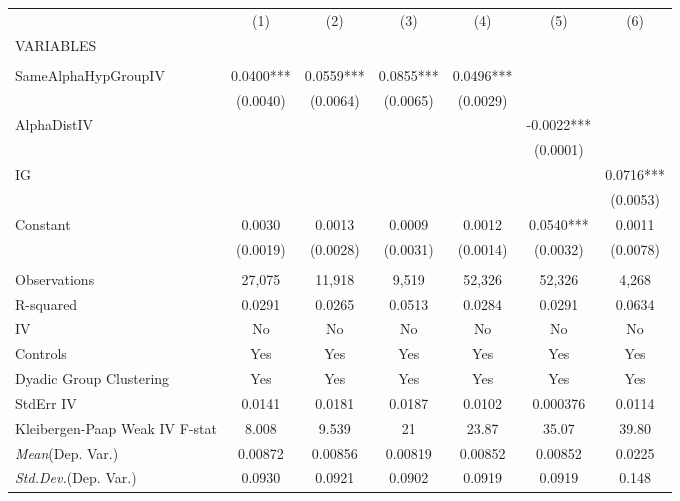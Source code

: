 \documentclass[]{article}
\begin{document}
\begin{tabular}{lcccccc} \hline
 & (1) & (2) & (3) & (4) & (5) & (6) \\
VARIABLES &  &  &  &  &  &  \\ \hline
 &  &  &  &  &  &  \\
SameAlphaHypGroupIV & 0.0400*** & 0.0559*** & 0.0855*** & 0.0496*** &  &  \\
 & (0.0040) & (0.0064) & (0.0065) & (0.0029) &  &  \\
AlphaDistIV &  &  &  &  & -0.0022*** &  \\
 &  &  &  &  & (0.0001) &  \\
IG &  &  &  &  &  & 0.0716*** \\
 &  &  &  &  &  & (0.0053) \\
Constant & 0.0030 & 0.0013 & 0.0009 & 0.0012 & 0.0540*** & 0.0011 \\
 & (0.0019) & (0.0028) & (0.0031) & (0.0014) & (0.0032) & (0.0078) \\
 &  &  &  &  &  &  \\
Observations & 27,075 & 11,918 & 9,519 & 52,326 & 52,326 & 4,268 \\
R-squared & 0.0291 & 0.0265 & 0.0513 & 0.0284 & 0.0291 & 0.0634 \\
IV & No & No & No & No & No & No \\
Controls & Yes & Yes & Yes & Yes & Yes & Yes \\
Dyadic Group Clustering & Yes & Yes & Yes & Yes & Yes & Yes \\
StdErr IV & 0.0141 & 0.0181 & 0.0187 & 0.0102 & 0.000376 & 0.0114 \\
Kleibergen-Paap Weak IV F-stat & 8.008 & 9.539 & 21 & 23.87 & 35.07 & 39.80 \\
\textit{Mean}(Dep. Var.) & 0.00872 & 0.00856 & 0.00819 & 0.00852 & 0.00852 & 0.0225 \\
 \textit{Std.Dev.}(Dep. Var.) & 0.0930 & 0.0921 & 0.0902 & 0.0919 & 0.0919 & 0.148 \\ \hline
\end{tabular}
\end{document}
